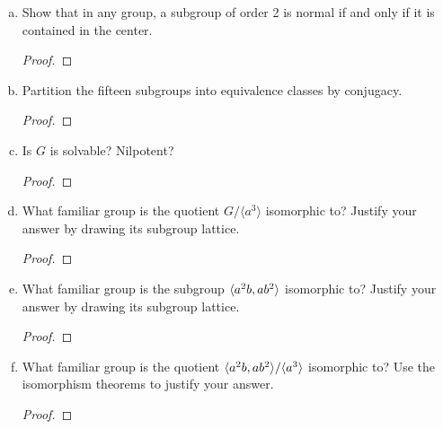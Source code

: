 \begin{itemize}
\begin{enumerate}[(a)]
    \item Show that in any group, a subgroup of order 2 is normal if and only if it is contained in the center.
    \begin{proof}

    \end{proof}
    
    \item Partition the fifteen subgroups into equivalence classes by conjugacy.
    \begin{proof}

    \end{proof}
    
    \item Is $G$ is solvable? Nilpotent?
    \begin{proof}

    \end{proof}
    
    \item What familiar group is the quotient $G/\langle a^3 \rangle$ isomorphic to? Justify your answer by drawing its subgroup lattice.
    \begin{proof}

    \end{proof}
    
    \item What familiar group is the subgroup $\langle{}a^2 b,a b^2\rangle$ isomorphic to? Justify your answer by drawing its subgroup lattice.
    \begin{proof}

    \end{proof}
    
    \item What familiar group is the quotient $\langle{}a^2 b,a b^2\rangle/\langle a^3 \rangle$ isomorphic to? Use the isomorphism theorems to justify your answer.
    \begin{proof}

    \end{proof}
\end{enumerate}















\end{itemize}
